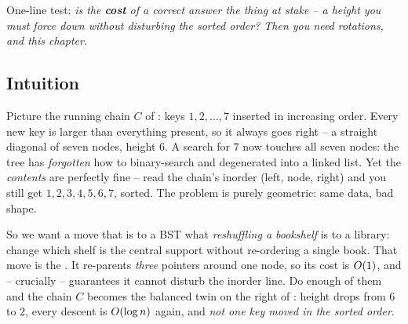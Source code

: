 \begin{recognitionbox}
One-line test: \emph{is the \textbf{cost} of a correct answer the thing at stake -- a height you must
force down without disturbing the sorted order? Then you need rotations, and this chapter.}
\end{recognitionbox}

\subsection{Intuition}

Picture the running chain $C$ of : keys $1,2,\dots,7$ inserted in increasing order.
Every new key is larger than everything present, so it always goes right -- a straight diagonal of
seven nodes, height $6$. A search for $7$ now touches all seven nodes: the tree has \emph{forgotten}
how to binary-search and degenerated into a linked list. Yet the \emph{contents} are perfectly fine --
read the chain's inorder (left, node, right) and you still get $1,2,3,4,5,6,7$, sorted. The problem is
purely geometric: same data, bad shape.

So we want a move that is to a BST what \emph{reshuffling a bookshelf} is to a library: change which
shelf is the central support without re-ordering a single book. That move is the . It
re-parents \emph{three} pointers around one node, so its cost is $O(1)$, and -- crucially --
 guarantees it cannot disturb the inorder line. Do enough of them and the chain
$C$ becomes the balanced twin on the right of : height drops from $6$ to $2$, every
descent is $O(\log n)$ again, and \emph{not one key moved in the sorted order}.

